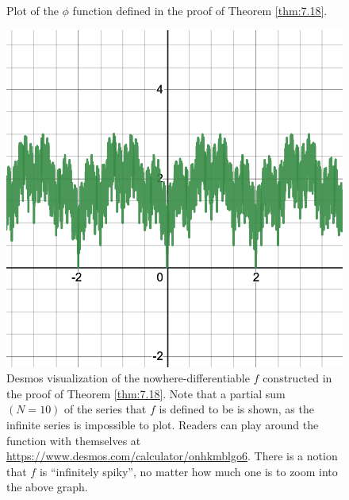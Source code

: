 \begin{figure}[htbp]
    \centering
    \caption{Plot of the $\phi$ function defined in the proof of Theorem \ref{thm:7.18}.}
    \label{fig45}
\end{figure}

\begin{figure}[htbp]
    \centering
    \includegraphics[scale=0.25]{Images/7-18-graph.png}
    
    \caption{Desmos visualization of the nowhere-differentiable $f$ constructed in the proof of Theorem \ref{thm:7.18}. Note that a partial sum $(N = 10)$ of the series that $f$ is defined to be is shown, as the infinite series is impossible to plot. Readers can play around the function with themselves at \url{https://www.desmos.com/calculator/onhkmblgo6}. There is a notion that $f$ is ``infinitely spiky'', no matter how much one is to zoom into the above graph.}
    \label{fig46}
\end{figure}

